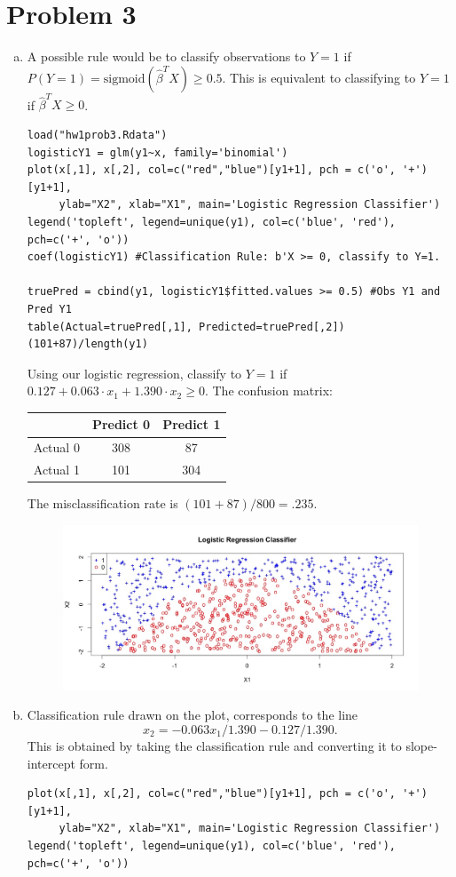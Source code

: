 \documentclass[12pt]{article}
\begin{document}
\section*{Problem 3}
\begin{enumerate}[(a)]
\item A possible rule would be to classify observations to $Y=1$ if $P(Y=1) = \text{sigmoid}(\hat{\beta}^T X) \geq 0.5$. This is equivalent to classifying to $Y=1$ if $\hat{\beta}^T X \geq 0$. 
\begin{lstlisting}
load("hw1prob3.Rdata")
logisticY1 = glm(y1~x, family='binomial')
plot(x[,1], x[,2], col=c("red","blue")[y1+1], pch = c('o', '+')[y1+1], 
     ylab="X2", xlab="X1", main='Logistic Regression Classifier')
legend('topleft', legend=unique(y1), col=c('blue', 'red'), pch=c('+', 'o'))
coef(logisticY1) #Classification Rule: b'X >= 0, classify to Y=1.

truePred = cbind(y1, logisticY1$fitted.values >= 0.5) #Obs Y1 and Pred Y1
table(Actual=truePred[,1], Predicted=truePred[,2])
(101+87)/length(y1)
\end{lstlisting}
Using our logistic regression, classify to $Y=1$ if $0.127 + 0.063 \cdot x_1 + 1.390 \cdot x_2 \geq 0$. The confusion matrix:
\begin{table}[H] \center
\begin{tabular}{ccc} \hline
& Predict 0 & Predict 1 \\ \hline
Actual 0 & 308 &  87 \\ 
Actual 1 & 101 & 304 \\ \hline
\end{tabular}
\end{table}
The misclassification rate is $ (101+87) / 800 = .235$.
\begin{figure}[H] \center
\includegraphics[scale=.4]{y1_plot.jpeg}
\end{figure}

\item Classification rule drawn on the plot, corresponds to the line 
$$x_2 = -0.063 x_1 / 1.390  - 0.127 / 1.390.$$ 
This is obtained by taking the classification rule and converting it to slope-intercept form.
\begin{lstlisting}
plot(x[,1], x[,2], col=c("red","blue")[y1+1], pch = c('o', '+')[y1+1], 
     ylab="X2", xlab="X1", main='Logistic Regression Classifier')
legend('topleft', legend=unique(y1), col=c('blue', 'red'), pch=c('+', 'o'))


\end{lstlisting}
\end{enumerate}
\end{document}
